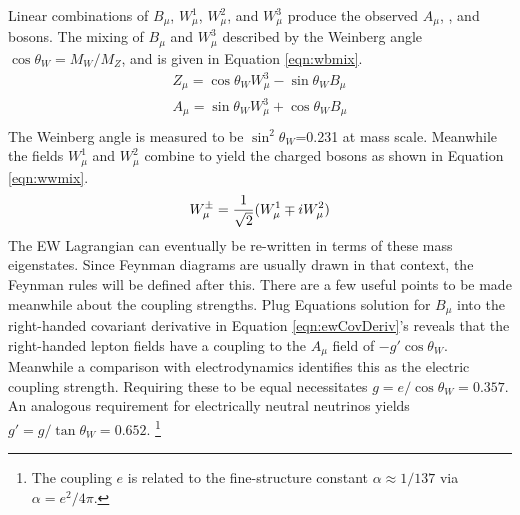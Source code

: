 Linear combinations of $B_\mu$, $W_\mu^1$, $W_\mu^2$, and $W_\mu^3$ produce the observed $A_\mu$, \Z, and \W bosons.
The mixing of $B_\mu$ and $W_\mu^3$ described by the Weinberg angle $\cos\theta_W=M_W/M_Z$, and is given in Equation \ref{eqn:wbmix}.
\begin{equation}\begin{split}\label{eqn:wbmix}
    Z_\mu=\cos\theta_W W^3_\mu-\sin\theta_W B_\mu \\
    A_\mu=\sin\theta_W W^3_\mu+\cos\theta_W B_\mu \\
\end{split}\end{equation}
The Weinberg angle is measured to be $\sin^2\theta_W$=0.231 at \Z mass scale.
Meanwhile the fields $W_\mu^1$ and $W_\mu^2$ combine to yield the charged \W bosons as shown in Equation \ref{eqn:wwmix}.
\begin{equation}\begin{split}\label{eqn:wwmix}
    W^\pm_\mu=\frac{1}{\sqrt{2}}(W_\mu^1\mp iW_\mu^2)
\end{split}\end{equation}
The EW Lagrangian can eventually be re-written in terms of these mass eigenstates.
Since Feynman diagrams are usually drawn in that context, the Feynman rules will be defined after this.
There are a few useful points to be made meanwhile about the coupling strengths.
Plug Equations \label{eqn:wbmix} solution for $B_\mu$ into the right-handed covariant derivative in Equation \ref{eqn:ewCovDeriv}'s reveals that the right-handed lepton fields have a coupling to the $A_\mu$ field of $-g'\cos\theta_W$.
Meanwhile a comparison with electrodynamics identifies this as the electric coupling strength.
Requiring these to be equal necessitates $g=e/\cos\theta_W=0.357$.
An analogous requirement for electrically neutral neutrinos yields $g'=g/\tan\theta_W=0.652$.
\footnote{The coupling $e$ is related to the fine-structure constant $\alpha\approx1/137$ via $\alpha=e^2/4\pi$.}

